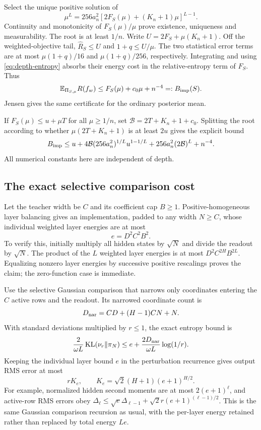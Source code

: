 Select the unique positive solution of
\begin{equation}
 \mu^L=256a_n^2[2F_S(\mu)+(K_n+1)\mu]^{L-1}.
 \label{eq:depth-root}
\end{equation}
Continuity and monotonicity of $F_S(\mu)/\mu$ prove existence, uniqueness and measurability. The root is at least $1/n$. Write $U=2F_S+\mu(K_n+1)$. Off the weighted-objective tail, $\widehat R_S\le U$ and $1+q\le U/\mu$. The two statistical error terms are at most $\mu(1+q)/16$ and $\mu(1+q)/256$, respectively. Integrating and using \eqref{eq:depth-entropy} absorbs their energy cost in the relative-entropy term of $F_S$. Thus
\begin{equation}
 \mathbb E_{\Pi_{S,\mu}}R(f_w)\le F_S(\mu)+c_0\mu+n^{-4}
                         =:B_{\rm imp}(S).
 \label{eq:depth-certificate}
\end{equation}
Jensen gives the same certificate for the ordinary posterior mean.

If $F_S(\mu)\le u+\mu T$ for all $\mu\ge1/n$, set
$\mathcal B=2T+K_n+1+c_0$. Splitting the root according to whether $\mu(2T+K_n+1)$ is at least $2u$ gives the explicit bound
\begin{equation}
 B_{\rm imp}\le u+
 4\mathcal B(256a_n^2)^{1/L}u^{1-1/L}
       +256a_n^2(2\mathcal B)^L+n^{-4}.
 \label{eq:depth-empirical-oracle}
\end{equation}
All numerical constants here are independent of depth.

\subsection{The exact selective comparison cost}
Let the teacher width be $C$ and its coefficient cap $B\ge1$. Positive-homogeneous layer balancing gives an implementation, padded to any width $N\ge C$, whose individual weighted layer energies are at most
\[
 e=D^2C^2B^2.
\]
To verify this, initially multiply all hidden states by $\sqrt N$ and divide the readout by $\sqrt N$. The product of the $L$ weighted layer energies is at most $D^2C^{2H}B^{2L}$. Equalizing nonzero layer energies by successive positive rescalings proves the claim; the zero-function case is immediate.

Use the selective Gaussian comparison that narrows only coordinates entering the $C$ active rows and the readout. Its narrowed coordinate count is
\[
 D_{\rm nar}=CD+(H-1)CN+N.
\]
With standard deviations multiplied by $r\le1$, the exact entropy bound is
\[
 \frac2{\omega L}\operatorname{KL}(\nu_r\Vert\pi_N)
 \le e+\frac{2D_{\rm nar}}{\omega L}\log(1/r).
\]
Keeping the individual layer bound $e$ in the perturbation recurrence gives output RMS error at most
\[
 rK_e,\qquad K_e=\sqrt2(H+1)(e+1)^{H/2}.
\]
For example, normalized hidden second moments are at most $2(e+1)^\ell$, and active-row RMS errors obey
$\Delta_\ell\le\sqrt e\Delta_{\ell-1}+\sqrt2r(e+1)^{(\ell-1)/2}$.
This is the same Gaussian comparison recursion as usual, with the per-layer energy retained rather than replaced by total energy $Le$.

